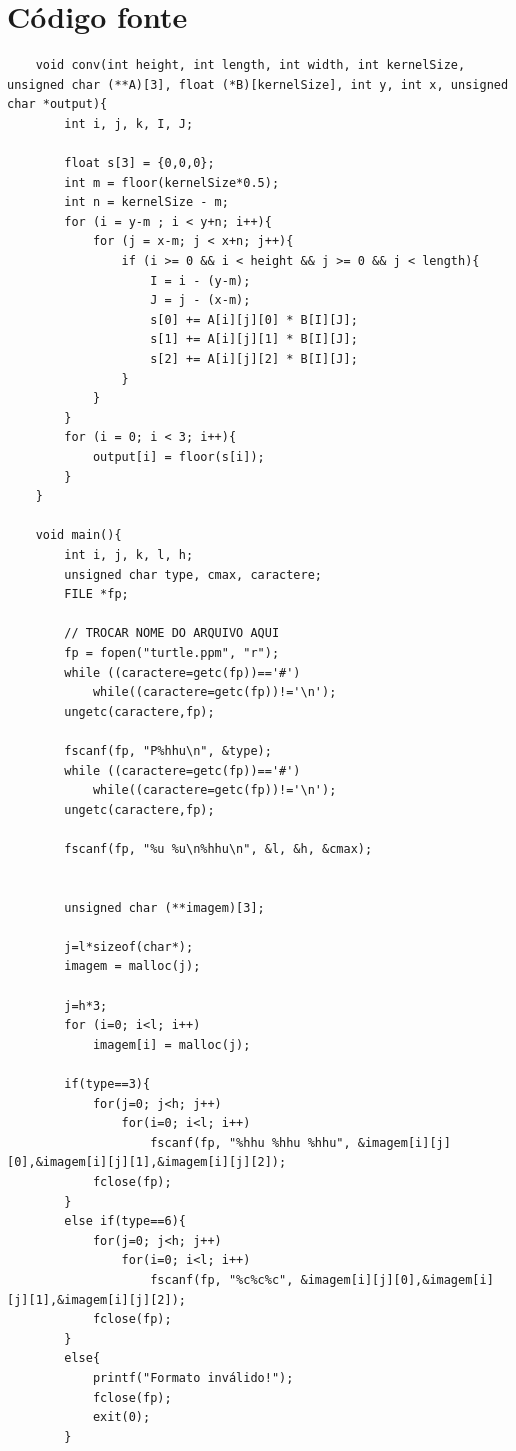 \documentclass[a4paper, 11pt]{article}
\begin{document}
\section*{Código fonte}
\begin{verbatim}
    void conv(int height, int length, int width, int kernelSize, unsigned char (**A)[3], float (*B)[kernelSize], int y, int x, unsigned char *output){
        int i, j, k, I, J;

        float s[3] = {0,0,0};
        int m = floor(kernelSize*0.5);
        int n = kernelSize - m;
        for (i = y-m ; i < y+n; i++){
            for (j = x-m; j < x+n; j++){
                if (i >= 0 && i < height && j >= 0 && j < length){
                    I = i - (y-m);
                    J = j - (x-m);
                    s[0] += A[i][j][0] * B[I][J];
                    s[1] += A[i][j][1] * B[I][J];
                    s[2] += A[i][j][2] * B[I][J];
                }
            }
        }
        for (i = 0; i < 3; i++){
            output[i] = floor(s[i]);
        }
    }

    void main(){
        int i, j, k, l, h;
        unsigned char type, cmax, caractere;
        FILE *fp;

        // TROCAR NOME DO ARQUIVO AQUI
        fp = fopen("turtle.ppm", "r");
        while ((caractere=getc(fp))=='#')
            while((caractere=getc(fp))!='\n');
        ungetc(caractere,fp);

        fscanf(fp, "P%hhu\n", &type);
        while ((caractere=getc(fp))=='#')
            while((caractere=getc(fp))!='\n');
        ungetc(caractere,fp);

        fscanf(fp, "%u %u\n%hhu\n", &l, &h, &cmax);


        unsigned char (**imagem)[3];

        j=l*sizeof(char*);
        imagem = malloc(j);

        j=h*3;
        for (i=0; i<l; i++)
            imagem[i] = malloc(j);

        if(type==3){
            for(j=0; j<h; j++)
                for(i=0; i<l; i++)
                    fscanf(fp, "%hhu %hhu %hhu", &imagem[i][j][0],&imagem[i][j][1],&imagem[i][j][2]);
            fclose(fp);
        }
        else if(type==6){
            for(j=0; j<h; j++)
                for(i=0; i<l; i++)
                    fscanf(fp, "%c%c%c", &imagem[i][j][0],&imagem[i][j][1],&imagem[i][j][2]);
            fclose(fp);
        }       
        else{
            printf("Formato inválido!");
            fclose(fp);
            exit(0);
        }


\end{verbatim}
\end{document}
